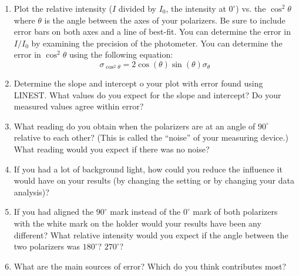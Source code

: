 \begin{enumerate}
\item Plot the relative intensity ($I$ divided by $I_0$, the intensity at $0^{\circ}$) vs. the $\cos^2\theta$ where $\theta$ is the angle between the axes of your polarizers. Be sure to include error bars on both axes and a line of best-fit. You can determine the error in $I/I_0$ by examining the precision of the photometer. You can determine the error in $\cos^2\theta$ using the following equation:
\begin{equation}
 \sigma_{\cos^2\theta} = 2\cos(\theta)\sin(\theta)\sigma_{\theta}
\end{equation}

\item Determine the slope and intercept o your plot with error found using LINEST. What values do you expect for the slope and intercept? Do your measured values agree within error?

\item What reading do you obtain when the polarizers are at an angle of $90^{\circ}$ relative to each other? (This is called the ``noise'' of your measuring device.) What reading would you expect if there was no noise?

\item If you had a lot of background light, how could you reduce the influence it would have on your results (by changing the setting or by changing your data analysis)?

\item If you had aligned the $90^{\circ}$ mark instead of the $0^{\circ}$ mark of both polarizers with the white mark on the holder would your results have been any different? What relative intensity would you expect if the angle between the two polarizers was $180^{\circ}$? $270^{\circ}$?

\item What are the main sources of error? Which do you think contributes most?
\end{enumerate}

